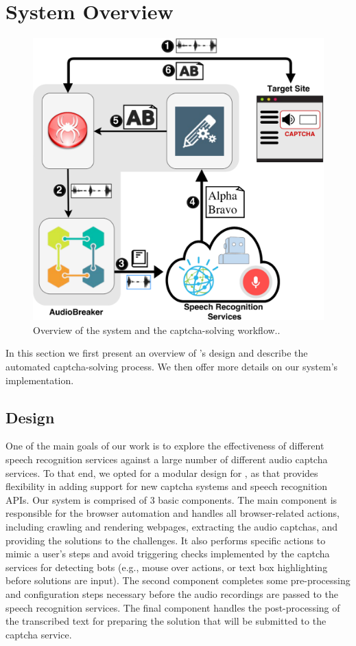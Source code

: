 \section{System Overview}
\label{sec:system}

\begin{figure}
\centering
\includegraphics[width=\columnwidth]{figures/breaker_arch.pdf}
\caption{Overview of the \system system and the captcha-solving workflow..}
\label{fig:breaker}
\end{figure}

In this section we first present an overview of \system's design and describe the automated 
captcha-solving process. We then offer more details on our system's implementation.

\subsection{\system Design}

One of the main goals of our work is to explore the effectiveness of different speech recognition
services against a large number of different audio captcha services. To that end, we opted for 
a modular design for \system, as that provides flexibility in adding support for new captcha 
systems and speech recognition APIs. Our system is comprised of 3 basic components. The main 
component is responsible for the browser automation and handles all browser-related actions,
including crawling and rendering webpages, extracting the audio captchas, and providing the solutions
to the challenges. It also performs specific actions to mimic a user's steps and avoid triggering  
checks implemented by the captcha services for detecting bots (e.g., mouse over actions, or text 
box highlighting before solutions are input).
The second component completes some pre-processing and configuration steps 
necessary before the audio recordings are passed to the speech recognition services. The final 
component handles the post-processing of the transcribed text for preparing the solution that will
be submitted to the captcha service.

